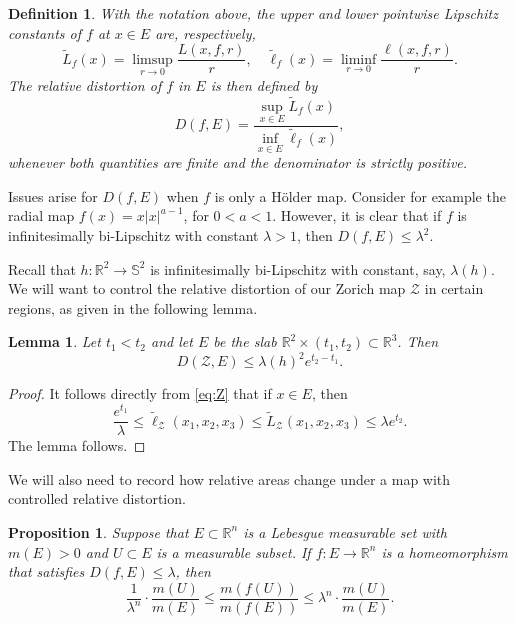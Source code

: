 \documentclass[11pt]{amsart}
\newtheorem{lemma}[theorem]{Lemma}
\newtheorem{proposition}[theorem]{Proposition}
\newtheorem{definition}[theorem]{Definition}
\numberwithin{equation}{section}
\theoremstyle{definition}
\theoremstyle{definition}
\theoremstyle{definition}
\newcommand{\R}{\mathbb{R}}
\renewcommand{\S}{\mathbb{S}}
\begin{document}
\begin{definition}
    \label{def:df}
With the notation above, the upper and lower pointwise Lipschitz constants of $f$ at $x\in E$ are, respectively,
\[ \widetilde{L}_f (x) = \limsup_{r\to 0} \frac{ L(x,f,r)}{r}, \quad \widetilde{\ell}_f(x) = \liminf_{r\to 0} \frac{ \ell(x,f,r)}{r} .\]
The {\it relative distortion} of $f$ in $E$ is then defined by
\[ D(f,E) = \frac{ \sup_{x\in E} \widetilde{L}_f(x) }{ \inf_{x\in E} \widetilde{\ell}_f(x) },\]
whenever both quantities are finite and the denominator is strictly positive.
\end{definition}

Issues arise for $D(f,E)$ when $f$ is only a H\"older map. Consider for example the radial map $f(x) = x|x|^{a-1}$, for $0<a<1$. However, it is clear that if $f$ is infinitesimally bi-Lipschitz with constant $\lambda >1$, then $D(f,E) \leq \lambda^2$.

Recall that $h:\R^2 \to \S^2$ is infinitesimally bi-Lipschitz with constant, say, $\lambda(h)$. We will want to control the relative distortion of our Zorich map $\mathcal{Z}$ in certain regions, as given in the following lemma.

\begin{lemma}
\label{lem:4}
Let $t_1<t_2$ and let $E$ be the slab $\R^2 \times (t_1,t_2) \subset \R^3$. Then 
\[ D(\mathcal{Z} , E) \leq \lambda(h)^2 e^{t_2-t_1}.\]
\end{lemma}

\begin{proof}
It follows directly from \eqref{eq:Z} that if $x\in E$, then
\[ \frac{e^{t_1}}{\lambda} \leq \widetilde{\ell}_{\mathcal{Z}} ( x_1,x_2,x_3) \leq \widetilde{L}_{\mathcal{Z}}(x_1,x_2,x_3) \leq \lambda e^{t_2}.\]
The lemma follows.
\end{proof}

We will also need to record how relative areas change under a map with controlled relative distortion.

\begin{proposition}
    \label{prop:reldist}
Suppose that $E\subset \R^n$ is a Lebesgue measurable set with $m(E) > 0$ and $U \subset E$ is a measurable subset. If $f:E \to \R^n$ is a homeomorphism that satisfies $D(f,E) \leq \lambda$, then 
\[ \frac{1}{\lambda^n} \cdot \frac{m(U)}{m(E)} \leq \frac{ m(f(U))}{m(f(E))} \leq \lambda^n \cdot \frac{ m(U)}{m(E)}.  \]
\end{proposition}
\end{document}
